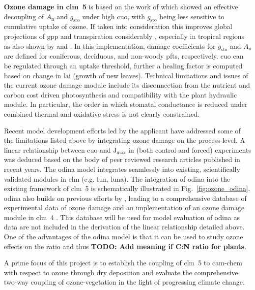 \textbf{Ozone damage in \gls{clm}~5} is based on the work of \textcite{Oe:Lombardozzi2012} which showed an effective decoupling of $A_\mathrm{n}$ and $g_\mathrm{sto}$ under high \gls{cuo}, with $g_\mathrm{sto}$ being less sensitive to cumulative uptake of ozone. If taken into consideration this improves global projections of \gls{gpp} and transpiration considerably \parencite{BGS:Lombardozzi2012}, especially in tropical regions as also shown by \textcite{Nat:Sitch2007} and \textcite{ACP:Pacifico2015}. In this implementation, damage coefficients for $g_\mathrm{sto}$ and $A_\mathrm{n}$ are defined for coniferous, deciduous, and non-woody \glspl{pft}, respectively. \gls{cuo} can be regulated through an uptake threshold, further a healing factor is computed based on change in \gls{lai} (growth of new leaves). Technical limitations and issues of the current ozone damage module include its disconnection from the nutrient and carbon cost driven photosynthesis and compatibility with the plant hydraulic module. In particular, the order in which stomatal conductance is reduced under combined thermal and oxidative stress is not clearly constrained.

Recent model development efforts led by the applicant have addressed some of the limitations listed above by integrating ozone damage on the process-level. A linear relationship between \gls{cuo} and $\mathrm{J_{max}}$ in (both control and forced) experiments was deduced based on the body of peer reviewed research articles published in recent years. The \gls{odina} model integrates seamlessly into existing, scientifically validated modules in \gls{clm} (e.g. \gls{fun}, \gls{luna}). The integration of \gls{odina} into the existing framework of \gls{clm}~5 is schematically illustrated in Fig.~\ref{fig:ozone_odina}. \gls{odina} also builds on previous efforts by \textcites{BGS:Lombardozzi2012}{Oe:Lombardozzi2012}, leading to a comprehensive database of experimental data of ozone damage and an implementation of an ozone damage module in \gls{clm}~4 \parencite{BGS:Lombardozzi2013}. This database will be used for model evaluation of \gls{odina} as data are not included in the derivation of the linear relationship detailed above. One of the advantages of the \gls{odina} model is that it can be used to study ozone effects on the  ratio and thus \textbf{\color{red}TODO: Add meaning if C:N ratio for plants}.

A prime focus of this project is to establish the coupling of \gls{clm}~5 to \gls{cam}-chem with respect to ozone through dry deposition and evaluate the comprehensive two-way coupling of ozone-vegetation in the light of progressing climate change.
